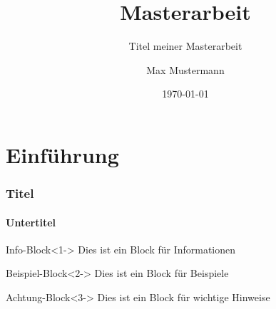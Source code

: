 \documentclass{beamer}
\title{Masterarbeit}
\subtitle{Titel meiner Masterarbeit}
\author{Max Mustermann}
\date{\today}
\institute{Hochschule Musterstadt}
\begin{document}
	
\section{Einführung}

\begin{frame}
\frametitle{Titel}
\framesubtitle{Untertitel}

\begin{block}{Info-Block}<1->
Dies ist ein Block für Informationen
\end{block}	

\begin{exampleblock}{Beispiel-Block}<2->
Dies ist ein Block für Beispiele
\end{exampleblock}

\begin{alertblock}{Achtung-Block}<3->
Dies ist ein Block für wichtige Hinweise
\end{alertblock}

\end{frame}
\end{document}
